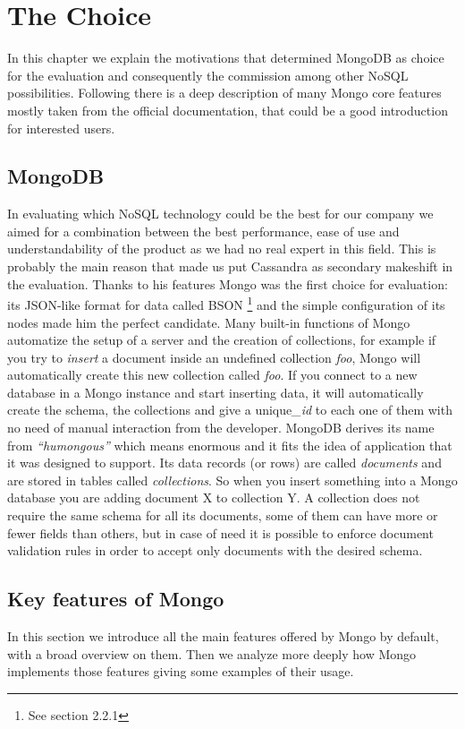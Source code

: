 \chapter{The Choice}
\label{cha:2}
In this chapter we explain the motivations that determined  MongoDB as choice for the evaluation and consequently the commission among other NoSQL possibilities.
Following there is a deep description of many Mongo core features mostly taken from the official documentation, that could be a good introduction for interested users.

\section{MongoDB}
\label{sec:1}
In evaluating which NoSQL technology could be the best for our company we aimed for a combination between the best performance,  ease of use and understandability of the product as we had no real expert in this field.
This is probably the main reason that made us put Cassandra as secondary makeshift in the evaluation.
Thanks to his features Mongo was the first choice for evaluation: its JSON-like format for data called BSON \footnote{See section 2.2.1} and the simple configuration of its nodes made him the perfect candidate.
Many built-in functions of Mongo automatize the setup of a server and the creation of collections, for example if you try to \textit{insert} a document inside an undefined collection \textit{foo}, Mongo will automatically create this new collection called \textit{foo}.
If you connect to a new database in a Mongo instance and start inserting data, it will automatically create the schema, the collections and give a unique\textit{\_id} to each one of them  with no need of manual interaction from the developer.
MongoDB derives its name from \textit{“humongous”} which means enormous and it fits the idea of application that it was designed to support.
Its data records (or rows) are called \textit{documents} and are stored in tables called \textit{collections}. So when you insert something into a Mongo database you are adding document X to collection Y.
A collection does not require the same schema for all its documents, some of them can have more or fewer fields than others, but in case of need it is possible to enforce document validation rules in order to accept only documents with the desired schema.

\section{Key features of Mongo}
\label{sec:2}
In this section we introduce all the main features offered by Mongo by default, with a broad overview on them. 
Then we analyze more deeply how Mongo implements those features giving some examples of their usage.

